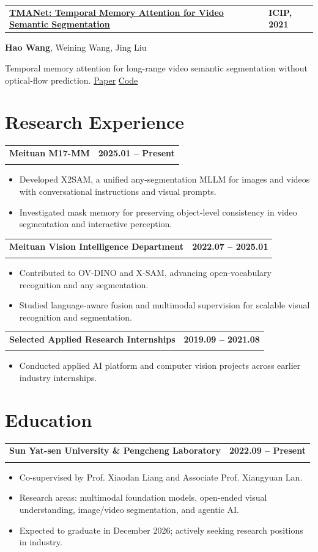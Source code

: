\documentclass[10pt,letterpaper]{article}
\makeatletter
\newcommand{\datebadge}[1]{%
  \begingroup
  \textcolor{muted}{\footnotesize\bfseries #1}%
  \endgroup
}
\newcommand{\cvitem}[4]{%
  \Needspace{7\baselineskip}
  \vspace{2pt}
  \begin{tabularx}{\textwidth}{@{}>{\RaggedRight\arraybackslash}X>{\RaggedLeft\arraybackslash}p{0.23\textwidth}@{}}
    \textbf{\color{ink}#1} & \datebadge{#2} \\
    {\small\color{muted}#3} & \\
  \end{tabularx}
  \vspace{-2pt}
  #4
}
\newcommand{\publication}[5]{%
  \Needspace{5\baselineskip}
  \vspace{2pt}
  \begin{tabularx}{\textwidth}{@{}>{\RaggedRight\arraybackslash}X>{\RaggedLeft\arraybackslash}p{0.18\textwidth}@{}}
    \textbf{\href{#1}{\color{ink}#2}} & \datebadge{#3}
  \end{tabularx}
  {\small #4}\par
  \vspace{1pt}
  {\small\color{muted}#5}\par
  \vspace{7pt}
}
\makeatother
\begin{document}
\publication
  {https://wanghao9610.github.io/TMANet/}
  {TMANet: Temporal Memory Attention for Video Semantic Segmentation}
  {ICIP, 2021}
  {\textbf{Hao Wang}, Weining Wang, Jing Liu}
  {Temporal memory attention for long-range video semantic segmentation without optical-flow prediction. \href{https://arxiv.org/abs/2102.08643}{Paper} \textbar{} \href{https://github.com/wanghao9610/TMANet}{Code}}

\newpage
\section{Research Experience}
\cvitem
  {Meituan M17-MM}
  {2025.01 -- Present}
  {Research Intern}
  {\begin{itemize}
    \item Developed X2SAM, a unified any-segmentation MLLM for images and videos with conversational instructions and visual prompts.
    \item Investigated mask memory for preserving object-level consistency in video segmentation and interactive perception.
  \end{itemize}}

\cvitem
  {Meituan Vision Intelligence Department}
  {2022.07 -- 2025.01}
  {Research Intern}
  {\begin{itemize}
    \item Contributed to OV-DINO and X-SAM, advancing open-vocabulary recognition and any segmentation.
    \item Studied language-aware fusion and multimodal supervision for scalable visual recognition and segmentation.
  \end{itemize}}

\cvitem
  {Selected Applied Research Internships}
  {2019.09 -- 2021.08}
  {Tencent AI Platform Department; Huawei Photo Processing Department}
  {\begin{itemize}
    \item Conducted applied AI platform and computer vision projects across earlier industry internships.
  \end{itemize}}

\section{Education}
\cvitem
  {Sun Yat-sen University \& Pengcheng Laboratory}
  {2022.09 -- Present}
  {Ph.D. student, School of Intelligent Systems Engineering}
  {\begin{itemize}
    \item Co-supervised by Prof. Xiaodan Liang and Associate Prof. Xiangyuan Lan.
    \item Research areas: multimodal foundation models, open-ended visual understanding, image/video segmentation, and agentic AI.
    \item Expected to graduate in December 2026; actively seeking research positions in industry.
  \end{itemize}}
\end{document}
